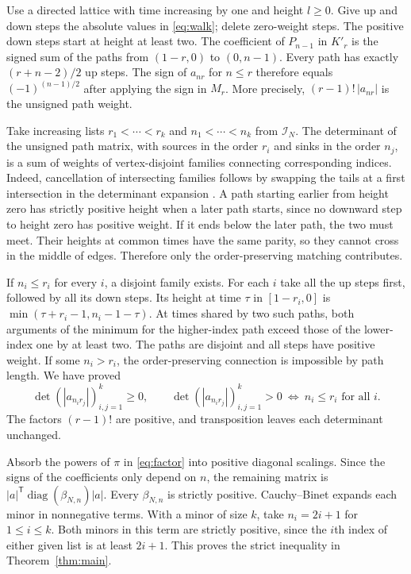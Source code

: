 \documentclass[11pt]{article}
\newcommand{\ind}{\mathcal I_N}
\begin{document}
Use a directed lattice with time increasing by one and height $l\ge0$.
Give up and down steps the absolute values in \eqref{eq:walk};
delete zero-weight steps. The positive down steps start at height at
least two. The coefficient of $P_{n-1}$ in $K'_r$ is the signed sum
of the paths from $(1-r,0)$ to $(0,n-1)$. Every path has exactly
$(r+n-2)/2$ up steps. The sign of $a_{nr}$ for $n\le r$ therefore
equals $(-1)^{(n-1)/2}$ after applying the sign in $M_r$.
More precisely, $(r-1)!\,|a_{nr}|$ is the unsigned path weight.

Take increasing lists $r_1<\cdots<r_k$ and $n_1<\cdots<n_k$ from
$\ind$. The determinant of the unsigned path matrix, with sources in
the order $r_i$ and sinks in the order $n_j$, is a sum of weights
of vertex-disjoint families connecting corresponding indices.
Indeed, cancellation of intersecting families follows by swapping the
tails at a first intersection in the determinant expansion
\cite{gv}. A path starting earlier from height zero has strictly
positive height when a later path starts, since no downward step to
height zero has positive weight. If it ends below the later path, the
two must meet. Their heights at common times have the same parity,
so they cannot cross in the middle of edges. Therefore only the
order-preserving matching contributes.

If $n_i\le r_i$ for every $i$, a disjoint family exists. For each $i$
take all the up steps first, followed by all its down steps. Its height
at time $\tau$ in $[1-r_i,0]$ is
$\min(\tau+r_i-1,n_i-1-\tau)$. At times shared by two such paths,
both arguments of the minimum for the higher-index path exceed those
of the lower-index one by at least two. The paths are disjoint and
all steps have positive weight. If some $n_i>r_i$, the
order-preserving connection is impossible by path length. We have proved
\[
 \det(|a_{n_i r_j}|)_{i,j=1}^k\ge0,\qquad
 \det(|a_{n_i r_j}|)_{i,j=1}^k>0
 \ \Longleftrightarrow\ n_i\le r_i\text{ for all }i .
\]
The factors $(r-1)!$ are positive, and transposition leaves each
determinant unchanged.

Absorb the powers of $\pi$ in \eqref{eq:factor} into positive
diagonal scalings. Since the signs of the coefficients only depend
on $n$, the remaining matrix is
$|a|^{\mathsf T}\operatorname{diag}(\beta_{N,n})|a|$.
Every $\beta_{N,n}$ is strictly positive. Cauchy--Binet expands
each minor in nonnegative terms. With a minor of size $k$, take
$n_i=2i+1$ for $1\le i\le k$. Both minors in this term are strictly
positive, since the $i$th index of either given list is at least
$2i+1$. This proves the strict inequality in Theorem~\ref{thm:main}.
\end{document}
